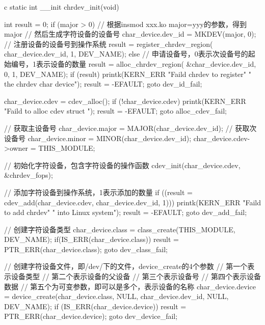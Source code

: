 \begin{code-block}{c}
static int __init chrdev_init(void)
{
        int result = 0;
        if (major > 0) {
                // 根据insmod xxx.ko major=yyy的参数，得到major
                // 然后生成字符设备的设备号
                char_device.dev_id = MKDEV(major, 0);
                // 注册设备的设备号到操作系统
                result = register_chrdev_region(
                        char_device.dev_id, 1, DEV_NAME);
        } else {
                // 申请设备号，0表示次设备号的起始编号，1表示设备的数量
                result = alloc_chrdev_region(
                        &char_device.dev_id, 0, 1, DEV_NAME);
        }
        if (result) {
                printk(KERN_ERR
                        "Faild chrdev to register"
                        " the chrdev char device\n");
                result = -EFAULT;
                goto dev_id_fail;
        }

        char_device.cdev = cdev_alloc();
        if (!char_device.cdev) {
                printk(KERN_ERR "Faild to alloc cdev struct \n");
                result = -EFAULT;
                goto alloc_cdev_fail;
        }

        // 获取主设备号
        char_device.major = MAJOR(char_device.dev_id);
        // 获取次设备号
        char_device.minor = MINOR(char_device.dev_id);
        char_device.cdev->owner = THIS_MODULE;

        // 初始化字符设备，包含字符设备的操作函数
        cdev_init(char_device.cdev, &chrdev_fops);

        // 添加字符设备到操作系统，1表示添加的数量
        if ((result = cdev_add(char_device.cdev, char_device.dev_id, 1))) {
                printk(KERN_ERR "Faild to add chrdev"
                                " into Linux system\n");
                result = -EFAULT;
                goto dev_add_fail;
        }

        // 创建字符设备类型
        char_device.class = class_create(THIS_MODULE, DEV_NAME);
        if(IS_ERR(char_device.class)){
                result = PTR_ERR(char_device.class);
                goto dev_class_fail;
        }

        // 创建字符设备文件，即/dev/下的文件，device_create的4个参数
        // 第一个表示设备类型
        // 第二个表示设备的父设备
        // 第三个表示设备号
        // 第四个表示设备数据
        // 第五个为可变参数，即可以是多个，表示设备的名称
        char_device.device = device_create(char_device.class, NULL,
                char_device.dev_id, NULL, DEV_NAME);
        if (IS_ERR(char_device.device)) {
                result = PTR_ERR(char_device.device);
                goto dev_device_fail;
        }

}
\end{code-block}
